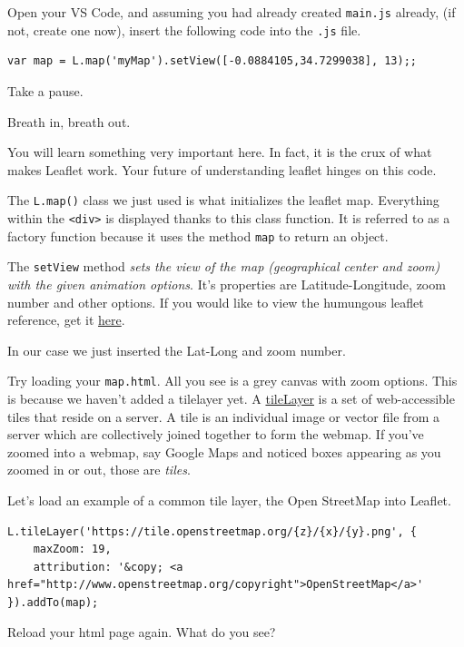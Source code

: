 \documentclass[
]{book}
\theoremstyle{definition}
\theoremstyle{definition}
\theoremstyle{definition}
\theoremstyle{definition}
\theoremstyle{remark}
\begin{document}
Open your VS Code, and assuming you had already created \texttt{main.js} already, (if not, create one now), insert the following code into the \texttt{.js} file.

\begin{verbatim}
var map = L.map('myMap').setView([-0.0884105,34.7299038], 13);;
\end{verbatim}

Take a pause.

Breath in, breath out.

You will learn something very important here. In fact, it is the crux of what makes Leaflet work. Your future of understanding leaflet hinges on this code.

The \texttt{L.map()} class we just used is what initializes the leaflet map. Everything within the \texttt{\textless{}div\textgreater{}} is displayed thanks to this class function. It is referred to as a factory function because it uses the method \texttt{map} to return an object.

The \texttt{setView} method \emph{sets the view of the map (geographical center and zoom) with the given animation options}. It's properties are Latitude-Longitude, zoom number and other options. If you would like to view the humungous leaflet reference, get it \href{https://leafletjs.com/reference.html}{here}.

In our case we just inserted the Lat-Long and zoom number.

Try loading your \texttt{map.html}. All you see is a grey canvas with zoom options. This is because we haven't added a tilelayer yet. A \href{https://pro.arcgis.com/en/pro-app/latest/help/data/services/use-tiled-web-layers.htm}{tileLayer} is a set of web-accessible tiles that reside on a server. A tile is an individual image or vector file from a server which are collectively joined together to form the webmap. If you've zoomed into a webmap, say Google Maps and noticed boxes appearing as you zoomed in or out, those are \emph{tiles}.

Let's load an example of a common tile layer, the Open StreetMap into Leaflet.

\begin{verbatim}
L.tileLayer('https://tile.openstreetmap.org/{z}/{x}/{y}.png', {
    maxZoom: 19,
    attribution: '&copy; <a href="http://www.openstreetmap.org/copyright">OpenStreetMap</a>'
}).addTo(map);
\end{verbatim}

Reload your html page again. What do you see?
\end{document}
